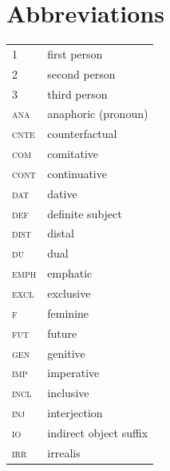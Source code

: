 \documentclass[output=paper,colorlinks,citecolor=brown]{langscibook}
\begin{document}
\section*{Abbreviations}
\begin{tabularx}{.45\textwidth}{lQ}
1 & first person \\
2 & second person \\
3 & third person \\
\scshape ana & anaphoric (pronoun) \\
\scshape cnte & counterfactual \\
\scshape com & comitative \\
\scshape cont & continuative \\
\scshape dat & dative \\
\scshape def & definite subject \\
\scshape dist & distal \\
\scshape du & dual \\
\scshape emph & emphatic \\
\scshape excl & exclusive \\
\scshape f & feminine \\
\scshape fut & future \\
\scshape gen & genitive \\
\scshape imp & imperative \\
\scshape incl & inclusive \\
\scshape inj & interjection \\
\scshape io & indirect object suffix \\
\scshape irr & irrealis \\
\end{tabularx}%
\end{document}
